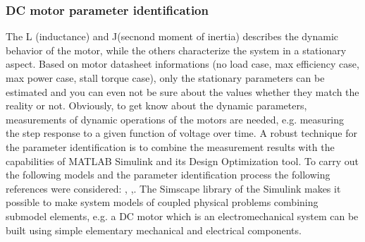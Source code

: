 \documentclass[12pt,english]{article}
\begin{document}
\subsubsection{DC motor parameter identification}
The L (inductance) and J(secnond moment of inertia) describes the dynamic behavior of the motor, while the others characterize the system in a stationary aspect. Based on motor datasheet informations (no load case, max efficiency case, max power case, stall torque case), only the stationary parameters can be estimated and you can even not be sure about the values whether they match the reality or not. Obviously, to get know about the dynamic parameters, measurements of dynamic operations of the motors are needed, e.g. measuring the step response to a given function of voltage over time. A robust technique for the parameter identification is to combine the measurement results with the capabilities of MATLAB Simulink and its Design Optimization tool. To carry out the following models and the parameter identification process the following references were considered: \cite{par_est_1}, \cite{par_est_2},\cite{par_est_3}. The Simscape library of the Simulink makes it possible to make system models of coupled physical problems combining submodel elements, e.g. a DC motor which is an electromechanical system can be built using simple elementary mechanical and electrical components.
\end{document}
